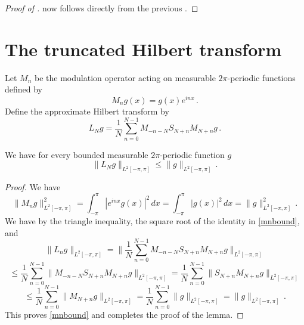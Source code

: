 \begin{proof}[Proof of ]
\leanok
{}
     now follows directly from the previous .
\end{proof}


\section{The truncated Hilbert transform}
\label{10hilbert}





Let $M_n$ be the modulation operator
acting on measurable $2\pi$-periodic functions
defined by
\begin{equation}
    M_ng(x)=g(x) e^{inx}\, .
\end{equation}
Define the approximate Hilbert transform by
\begin{equation}
    L_N g=\frac 1N\sum_{n=0}^{N-1}
       M_{-n-N} S_{N+n}M_{N+n}g\, .
\end{equation}


\begin{lemma}
\label{modulated-averaged-projection}
\leanok
{}
We have for every bounded measurable $2\pi$-periodic function $g$
\begin{equation}\label{lnbound}
    \|L_Ng\|_{L^2[-\pi, \pi]}\le \|g\|_{L^2[-\pi, \pi]}\,.
\end{equation}
\end{lemma}
\begin{proof}
    We have
    \begin{equation}\label{mnbound}
        \|M_ng\|_{L^2[-\pi, \pi]}^2=\int_{-\pi}^{\pi} |e^{inx}g(x)|^2\, dx
        =\int_{-\pi}^{\pi} |g(x)|^2\, dx=\|g\|_{L^2[-\pi, \pi]}^2\, .
    \end{equation}
     We have by the triangle inequality, the square root of the identity in \eqref{mnbound}, and 
    \begin{equation*}
        \|L_ng\|_{L^2[-\pi, \pi]}=\|\frac 1N\sum_{n=0}^{N-1}
       M_{-n-N} S_{N+n}M_{N+n}g\|_{L^2[-\pi, \pi]}
    \end{equation*}
    \begin{equation*}
        \le \frac 1N\sum_{n=0}^{N-1} \|
       M_{-n-N} S_{N+n}M_{N+n}g\|_{L^2[-\pi, \pi]}
         = \frac 1N\sum_{n=0}^{N-1} \|
    S_{N+n}M_{N+n}g\|_{L^2[-\pi, \pi]}
    \end{equation*}
     \begin{equation}
     \le \frac 1N\sum_{n=0}^{N-1} \|
 M_{N+n}g\|_{L^2[-\pi, \pi]} = \frac 1N\sum_{n=0}^{N-1} \|
g\|_{L^2[-\pi, \pi]} =\|g\|_{L^2[-\pi, \pi]}\, .
    \end{equation}
This proves \eqref{mnbound} and completes the proof of the lemma.
\end{proof}

